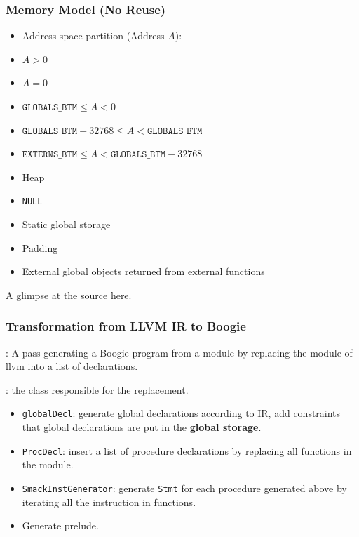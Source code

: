 \documentclass[11pt]{beamer}
\begin{document}
\begin{frame}\frametitle{Memory Model (No Reuse)}
\begin{itemize}
\item Address space partition (Address $A$):
\end{itemize}
\begin{multicols}{2}
\begin{itemize}
\item $A>0$
\item $A=0$
\item $\mathtt{GLOBALS\_BTM} \le A < 0$
\item $\mathtt{GLOBALS\_BTM} - 32768 \le A < \mathtt{GLOBALS\_BTM}$
\item $\mathtt{EXTERNS\_BTM}  \le A < \mathtt{GLOBALS\_BTM}- 32768$
\end{itemize}
\begin{itemize}
\item Heap
\item \texttt{NULL}
\item Static global storage
\item Padding
\item External global objects returned from external functions
\end{itemize}
\end{multicols}

A glimpse at the source here.


\end{frame}


\begin{frame}\frametitle{Transformation from LLVM IR to Boogie}
: \color{black}A pass generating a Boogie program from a module by replacing the module of llvm into a list of declarations.

: \color{black}the class responsible for the replacement.


\begin{itemize}
\item \texttt{globalDecl}: generate global declarations according to IR, add constraints that global declarations are put in the \textbf{global storage}.

\item \texttt{ProcDecl}: insert a list of procedure declarations by replacing all functions in the module.

\item \texttt{SmackInstGenerator}: generate \texttt{Stmt} for each procedure generated above by iterating all the instruction in functions.

\item Generate prelude.
\end{itemize}

\end{frame}
\end{document}
